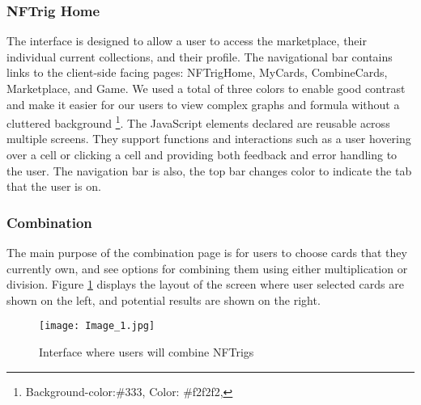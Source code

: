 \documentclass[acmsmall,nonacm]{acmart}
\begin{document}
\subsubsection{NFTrig Home}
The interface is designed to allow a user to access the marketplace, their individual current collections, and their profile. The navigational bar contains links to the client-side facing pages: NFTrigHome, MyCards, CombineCards, Marketplace, and Game. We used a total of three colors to enable good contrast and make it easier for our users to view complex graphs and formula without a cluttered background \footnote{Background-color:\#333, Color: \#f2f2f2,       }. The JavaScript elements declared are reusable across multiple screens. They support functions and interactions such as a user hovering over a cell or clicking a cell and providing both feedback and error handling to the user. The navigation bar is also, the top bar changes color to indicate the tab that the user is on.
 

\subsubsection{Combination}
The main purpose of the combination page is for users to choose cards that they currently own, and see options for combining them using either multiplication or division. 
Figure \ref{combination} displays the layout of the screen where user selected cards are shown on the left, and potential results are shown on the right.
\begin{figure}[!htb]
    \centering
    \texttt{[image: Image\_1.jpg]}
    \caption{Interface where users will combine NFTrigs}
    \label{combination}
\end{figure}
\end{document}
